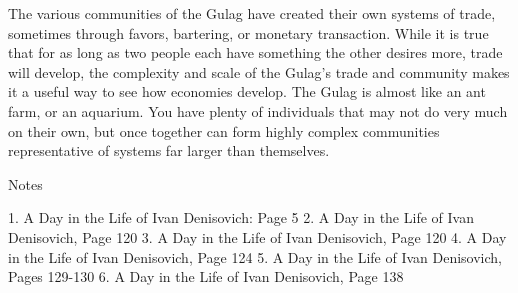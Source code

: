 \documentclass[12pt]{article}
\begin{document}
\begin{flushleft}
The various communities of the Gulag have created their own systems of trade, sometimes through favors, bartering, or monetary transaction. 
While it is true that for as long as two people each have something the other desires more, trade will develop, the complexity and scale of the Gulag's trade and community makes it a useful way to see how economies develop.
The Gulag is almost like an ant farm, or an aquarium. You have plenty of individuals that may not do very much on their own, but once together can form highly complex communities representative of systems far larger than themselves.



\begin{center}
Notes
\end{center}


\setlength{\parindent}{0.5in}

1. A Day in the Life of Ivan Denisovich: Page 5 
2. A Day in the Life of Ivan Denisovich, Page 120
3. A Day in the Life of Ivan Denisovich, Page 120
4. A Day in the Life of Ivan Denisovich, Page 124
5. A Day in the Life of Ivan Denisovich, Pages 129-130 
6. A Day in the Life of Ivan Denisovich, Page 138
\end{flushleft}
\end{document}
